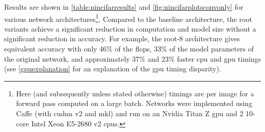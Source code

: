 \documentclass[thesis]{subfiles}
\begin{document}
	Results are shown in \cref{table:nincifarresults} and \cref{fig:nincifarplotsconvonly} for various network architectures\footnote{Here (and subsequently unless stated otherwise) timings are per image for a forward pass computed on a large batch. Networks were implemented using Caffe (with \gls{cudnn} v2 and \gls{mkl}) and run on an Nvidia Titan Z \gls{gpu} and 2 10-core Intel Xeon E5-2680 v2 \gls{cpu}s.}. Compared to the baseline architecture, the root variants achieve a significant reduction in computation and model size without a significant reduction in accuracy. For example, the root-8 architecture gives equivalent accuracy with only 46\% of the \gls{flops}, 33\% of the model parameters of the original network, and approximately 37\% and 23\% faster \gls{cpu} and \gls{gpu} timings (see \cref{gpuexplanation} for an explanation of the \gls{gpu} timing disparity).
	
	\newcommand{\covarlabels}[5]{%
		\begin{tikzpicture}[anchor=south west]
		\node [inner sep=0pt] (c)
		{
			#5
		};
		\ifx\covarwidth\undefined
		\newlength{\covarwidth}
		\newlength{\covarheight}
		\fi
		\settowidth{\covarwidth}{#5}
		\settoheight{\covarheight}{#5}
		\path[use as bounding box] (c.south west) rectangle (c.north east);
		\node [anchor=south east, xshift=\covarwidth, yshift=-0.2em] at (c.north west) {\tiny #4};
		\node [anchor=south west, xshift=0.25em, yshift=-1.05\covarheight, rotate=90] at (c.north west) {\tiny #2};
		\node [anchor=south, xshift=0.2\covarwidth, yshift=-0.2em] at (c.north west) {\scriptsize\texttt{#3}};
		\node [anchor=south, xshift=0.2em, yshift=-0.2\covarheight, rotate=90] at (c.north west) {\scriptsize\texttt{#1}};
		\end{tikzpicture}%
	}
	
\end{document}
